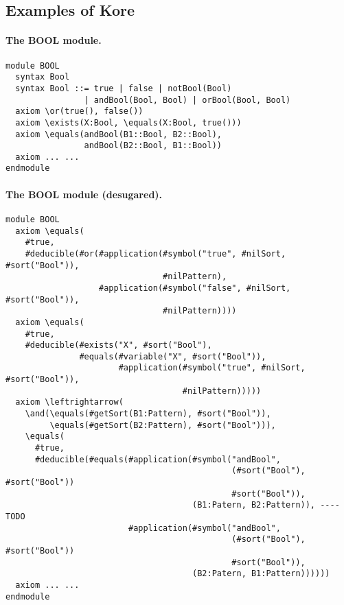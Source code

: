 \documentclass[UTF8,11pt]{article}
\theoremstyle{plain}
\theoremstyle{definition}
\theoremstyle{remark}
\begin{document}
\subsection{Examples of Kore}
\label{sec:examples-of-kore}


\paragraph{The {\small BOOL} module.}\quad
\begin{Verbatim}[fontsize=\small]
module BOOL
  syntax Bool
  syntax Bool ::= true | false | notBool(Bool)
                | andBool(Bool, Bool) | orBool(Bool, Bool)
  axiom \or(true(), false())
  axiom \exists(X:Bool, \equals(X:Bool, true()))
  axiom \equals(andBool(B1::Bool, B2::Bool), 
                andBool(B2::Bool, B1::Bool))
  axiom ... ...
endmodule
\end{Verbatim}

\paragraph{The {\small BOOL} module (desugared).}\quad
\begin{Verbatim}[fontsize=\small]
module BOOL
  axiom \equals(
    #true,
    #deducible(#or(#application(#symbol("true", #nilSort, #sort("Bool")),
                                #nilPattern), 
                   #application(#symbol("false", #nilSort, #sort("Bool")),
                                #nilPattern))))
  axiom \equals(
    #true,
    #deducible(#exists("X", #sort("Bool"), 
               #equals(#variable("X", #sort("Bool")), 
                       #application(#symbol("true", #nilSort, #sort("Bool")),
                                    #nilPattern)))))
  axiom \leftrightarrow(
    \and(\equals(#getSort(B1:Pattern), #sort("Bool")), 
         \equals(#getSort(B2:Pattern), #sort("Bool"))),
    \equals(
      #true,
      #deducible(#equals(#application(#symbol("andBool", 
                                              (#sort("Bool"), #sort("Bool"))
                                              #sort("Bool")), 
                                      (B1:Patern, B2:Pattern)), ---- TODO
                         #application(#symbol("andBool", 
                                              (#sort("Bool"), #sort("Bool"))
                                              #sort("Bool")), 
                                      (B2:Patern, B1:Pattern))))))
  axiom ... ...
endmodule
\end{Verbatim}
\end{document}
